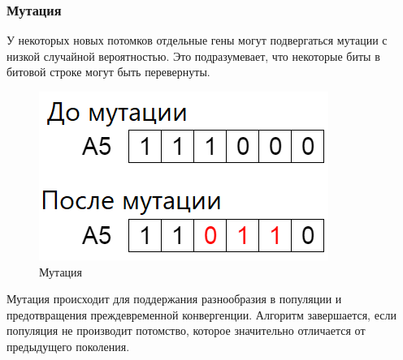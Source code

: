\subsubsection{Мутация}
У некоторых новых потомков отдельные  гены могут подвергаться мутации с низкой случайной вероятностью. Это подразумевает, что некоторые биты в битовой строке могут быть перевернуты.

\begin{figure}[H]
  \centering
  \includegraphics[width=0.4\linewidth]{./img/mutation}
  \caption{Мутация}
  \label{fig:mpr}
\end{figure}

\indent \indent Мутация происходит для поддержания разнообразия в популяции и предотвращения преждевременной конвергенции. Алгоритм завершается, если популяция не производит потомство, которое значительно отличается от предыдущего поколения.